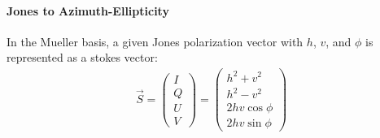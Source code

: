 \paragraph*{Jones to Azimuth-Ellipticity}
In the Mueller basis, a given Jones polarization vector with $h$, $v$, and $\phi$ is represented as a stokes vector:
\begin{align}
    \vec S = \begin{pmatrix}
        I \\ Q \\ U \\ V
    \end{pmatrix} = 
    \begin{pmatrix}
      h^2 + v^2\\
      h^2 - v^2\\
      2hv \cos \phi\\
      2hv \sin \phi  
    \end{pmatrix}
\end{align}

